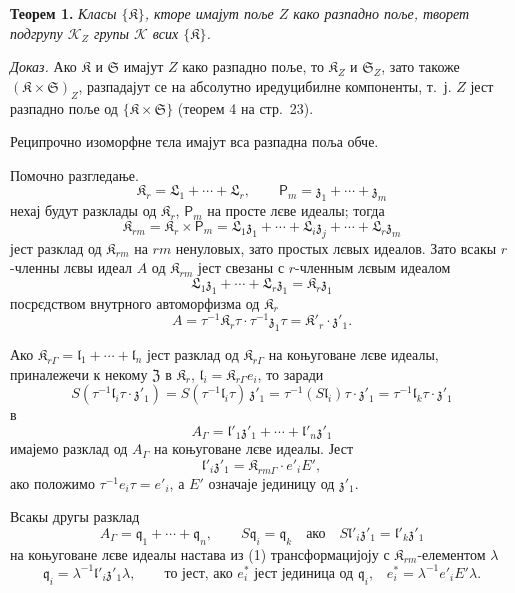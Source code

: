 \documentclass[11pt]{article}
\begin{document}
\textbf{Теорем 1.} \emph{Класы \(\{\mathfrak K\}\), кторе имајут поље \(Z\) како разпадно поље, творет подгрупу \(\mathscr K_Z\) групы \(\mathscr K\) всих \(\{\mathfrak K\}\).}

\emph{Доказ.} Ако \(\mathfrak K\) и \(\mathfrak S\) имајут \(Z\) како разпадно поље, то \(\mathfrak K_Z\) и \(\mathfrak S_Z\), зато такоже \((\mathfrak K\times\mathfrak S)_Z\), разпадајут се на абсолутно иредуцибилне компоненты, т.~ј. \(Z\) јест разпадно поље од \(\{\mathfrak K\times\mathfrak S\}\) (теорем 4 на стр.~23).

Реципрочно изоморфне тєла имајут вса разпадна поља обче.

Помочно разгледање.
\[
\mathfrak K_r=\mathfrak L_1+\cdots+\mathfrak L_r,\qquad
\mathsf P_m=\mathfrak z_1+\cdots+\mathfrak z_m
\]
нехај будут разклады од \(\mathfrak K_r\), \(\mathsf P_m\) на просте лєве идеалы; тогда
\[
\mathfrak K_{rm}=\mathfrak K_r\times\mathsf P_m
=\mathfrak L_1\mathfrak z_1+\cdots+\mathfrak L_i\mathfrak z_j+\cdots+\mathfrak L_r\mathfrak z_m
\]
јест разклад од \(\mathfrak K_{rm}\) на \(rm\) ненуловых, зато простых лєвых идеалов. Зато всакы \(r\)-членны лєвы идеал \(A\) од \(\mathfrak K_{rm}\) јест свезаны с \(r\)-членным лєвым идеалом
\[
\mathfrak L_1\mathfrak z_1+\cdots+\mathfrak L_r\mathfrak z_1=\mathfrak K_r\mathfrak z_1
\]
посрєдством внутрного автоморфизма од \(\mathfrak K_r\)
\[
A=\tau^{-1}\mathfrak K_r\tau\cdot\tau^{-1}\mathfrak z_1\tau
=\mathfrak K'_r\cdot\mathfrak z'_1.
\]

Ако \(\mathfrak K_{r\Gamma}=\mathfrak l_1+\cdots+\mathfrak l_n\) јест разклад од \(\mathfrak K_{r\Gamma}\) на коњуговане лєве идеалы, приналежечи к некому \(\mathfrak Z\) в \(\mathfrak K_r\), \(\mathfrak l_i=\mathfrak K_{r\Gamma}e_i\), то заради
\[
S(\tau^{-1}\mathfrak l_i\tau\cdot\mathfrak z'_1)
=S(\tau^{-1}\mathfrak l_i\tau)\,\mathfrak z'_1
=\tau^{-1}(S\mathfrak l_i)\tau\cdot\mathfrak z'_1
=\tau^{-1}\mathfrak l_k\tau\cdot\mathfrak z'_1
\]
в
\[
\tag{1}
A_\Gamma=\mathfrak l'_1\mathfrak z'_1+\cdots+\mathfrak l'_n\mathfrak z'_1
\]
имајемо разклад од \(A_\Gamma\) на коњуговане лєве идеалы. Јест
\[
\mathfrak l'_i\mathfrak z'_1=\mathfrak K_{rm\Gamma}\cdot e'_iE',
\]
ако положимо \(\tau^{-1}e_i\tau=e'_i\), а \(E'\) означаје јединицу од \(\mathfrak z'_1\).

Всакы другы разклад
\[
\tag{2}
A_\Gamma=\mathfrak q_1+\cdots+\mathfrak q_n,\qquad
S\mathfrak q_i=\mathfrak q_k\quad\text{ако}\quad
S\mathfrak l'_i\mathfrak z'_1=\mathfrak l'_k\mathfrak z'_1
\]
на коњуговане лєве идеалы настава из (1) трансформацијоју с \(\mathfrak K_{rm}\)-елементом \(\lambda\)
\[
\mathfrak q_i=\lambda^{-1}\mathfrak l'_i\mathfrak z'_1\lambda,
\qquad
\text{то јест, ако \(e_i^*\) јест јединица од \(\mathfrak q_i\),}\quad
e_i^*=\lambda^{-1}e'_iE'\lambda.
\]
\end{document}
